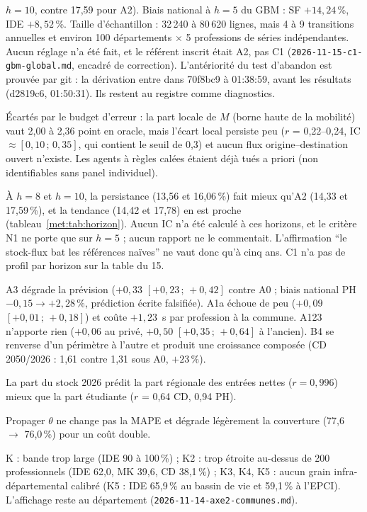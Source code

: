 \begin{description}
    $h = 10$, contre 17,59 pour A2). Biais national à $h = 5$ du GBM : SF $+14{,}24$\,\%\mesure, IDE
    $+8{,}52$\,\%\mesure. Taille d'échantillon : 32\,240 à 80\,620\mesure{} lignes, mais 4 à 9\mesure{}
    transitions annuelles et environ 100 départements $\times$ 5 professions de séries indépendantes\derive.
    Aucun réglage n'a été fait, et le référent inscrit était A2, pas C1 (\texttt{2026-11-15-c1-gbm-global.md},
    encadré de correction). L'antériorité du test d'abandon est prouvée par git : la dérivation entre dans
    70f8bc9 à 01:38:59\mesure, avant les résultats (d2819c6, 01:50:31\mesure). Ils restent au registre comme diagnostics.
  \item[Gravitaire et multi-agents.] Écartés par le budget d'erreur : la part locale de $M$ (borne haute de
    la mobilité) vaut 2,00 à 2,36\mesure{} point en oracle, mais l'écart local persiste peu
    ($r$ = 0,22--0,24\mesure{}, IC $\approx [0{,}10\,;\,0{,}35]$\derive, qui contient le seuil de 0,3) et aucun flux origine--destination ouvert n'existe. Les agents à
    règles calées étaient déjà tués a priori (non identifiables sans panel individuel).
  \item[Persistance meilleure qu'A2 à $h \ge 8$.] À $h = 8$ et $h = 10$, la persistance
    (13,56 et 16,06\,\%\mesure) fait mieux qu'A2 (14,33 et 17,59\,\%\mesure), et la tendance (14,42 et
    17,78) en est proche (tableau~\ref{met:tab:horizon}). Aucun IC n'a été calculé à ces horizons, et le
    critère N1 ne porte que sur $h = 5$ ; aucun rapport ne le commentait. L'affirmation \enquote{le
    stock-flux bat les références naïves} ne vaut donc qu'à cinq ans. C1 n'a pas de profil par horizon
    sur la table du 15.
  \item[Variantes stock-flux.] A3 dégrade la prévision ($+0{,}33$ $[+0{,}23\,;\,+0{,}42]$\mesure{} contre
    A0 ; biais national PH $-0{,}15 \to +2{,}28$\,\%\mesure, prédiction écrite falsifiée). A1a échoue de
    peu ($+0{,}09$ $[+0{,}01\,;\,+0{,}18]$\mesure) et coûte $+1{,}23$\mesure{}~s par profession à la
    commune. A123 n'apporte rien ($+0{,}06$ au privé, $+0{,}50$ $[+0{,}35\,;\,+0{,}64]$\mesure{} à
    l'ancien). B4 se renverse d'un périmètre à l'autre et produit une croissance composée
    (CD 2050/2026 : 1,61 contre 1,31\mesure{} sous A0, $+23\,\%$\derive).
  \item[C5, région de formation.] La part du stock 2026 prédit la part régionale des entrées nettes
    ($r = 0{,}996$\mesure) mieux que la part étudiante ($r$ = 0,64 CD, 0,94 PH\mesure).
  \item[C2.] Propager $\theta$ ne change pas la MAPE et dégrade légèrement la couverture (77,6 $\to$
    76,0\,\%\mesure) pour un coût double.
  \item[Échelle communale.] K : bande trop large (IDE 90 à 100\,\%\mesure) ; K2 : trop étroite au-dessus de
    200 professionnels (IDE 62,0, MK 39,6, CD 38,1\,\%\mesure) ; K3, K4, K5 : aucun grain
    infra-départemental calibré (K5 : IDE 65,9\,\% au bassin de vie et 59,1\,\% à l'EPCI\mesure).
    L'affichage reste au département (\texttt{2026-11-14-axe2-communes.md}).
\end{description}

